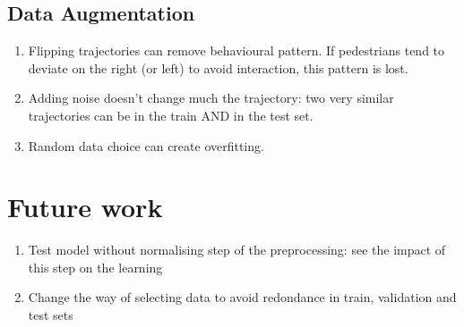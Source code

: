 \documentclass[a0,portrait]{a0poster}
\begin{document}
\begin{multicols}{2}
\subsection*{Data Augmentation}
\begin{enumerate}
\justifying
\item Flipping trajectories can remove behavioural pattern. If pedestrians tend to deviate on the right (or left) to avoid interaction, this pattern is lost. 
\item Adding noise doesn't change much the trajectory: two very similar trajectories can be in the train AND in the test set.
\item Random data choice can create overfitting.
\end{enumerate}

\section*{Future work}
\begin{enumerate}
\item Test model without normalising step of the preprocessing: see the impact of this step on the learning
\item Change the way of selecting data to avoid redondance in train, validation and test sets
\end{enumerate}



\nocite{*} %


\end{multicols}
\end{document}

